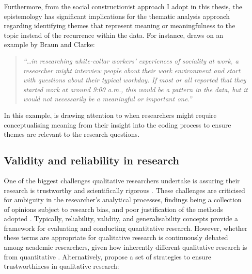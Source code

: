 Furthermore, from the social constructionist approach I adopt in this thesis, the epistemology has significant implications for the thematic analysis approach regarding identifying themes that represent meaning or meaningfulness to the topic instead of the recurrence within the data. For instance, \cite{byrne2021worked} draws on an example by Braun and Clarke: 

\begin{quote}
\textit{``…in researching white-collar workers’ experiences of sociality at work, a researcher might interview people about their work environment and start with questions about their typical workday. If most or all reported that they started work at around 9:00 a.m., this would be a pattern in the data, but it would not necessarily be a meaningful or important one.''} \citep[pg. 37]{braun2012thematic}
\end{quote}
In this example, \cite{byrne2021worked} is drawing attention to when researchers might require conceptualising meaning from their insight into the coding process to ensure themes are relevant to the research questions.

\subsection{Validity and reliability in research}
\label{TA:Reliability}
One of the biggest challenges qualitative researchers undertake is assuring their research is trustworthy and scientifically rigorous \citep{finlay2006rigour}. These challenges are criticised for ambiguity in the researcher's analytical processes, findings being a collection of opinions subject to research bias, and poor justification of the methods adopted \citep{rolfe2006validity}. Typically, reliability, validity, and generalisability concepts provide a framework for evaluating and conducting quantitative research. However, whether these terms are appropriate for qualitative research is continuously debated among academic researchers, given how inherently different qualitative research is from quantitative \citep{ryan2009rigour}. Alternatively, \cite{noble2015issues} propose a set of strategies to ensure trustworthiness in qualitative research:


